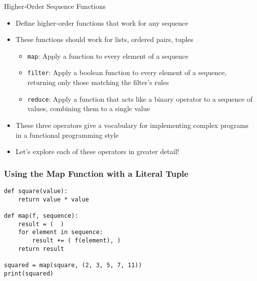 \documentclass[14pt,aspectratio=169]{beamer}
\begin{document}
%
\begin{frame}{Higher-Order Sequence Functions}
  \begin{itemize}
    \item Define higher-order functions that work for any sequence
      \vspace*{-.15in}
    \item These functions should work for lists, ordered pairs, tuples
      \begin{itemize}
        \item {\tt map}: Apply a function to every element of a sequence
        \item {\tt filter}: Apply a boolean function to every element of a
          sequence, returning only those matching the filter's rules
        \item {\tt reduce}: Apply a function that acts like a binary operator to
          a sequence of values, combining them to a single value
      \end{itemize}
      \vspace*{-.2in}
    \item These three operators give a vocabulary for implementing complex
      programs in a functional programming style
      \vspace*{-.2in}
    \item Let's explore each of these operators in greater detail!
  \end{itemize}
\end{frame}

%
\begin{frame}[fragile]
  \frametitle{Using the Map Function with a Literal Tuple}
  \begin{minipage}{6in}
    \vspace*{.15in}
    \begin{verbatim}
def square(value):
    return value * value

def map(f, sequence):
    result = (  )
    for element in sequence:
        result += ( f(element), )
    return result

squared = map(square, (2, 3, 5, 7, 11))
print(squared)
    \end{verbatim}
  \end{minipage}
\end{frame}
\end{document}
